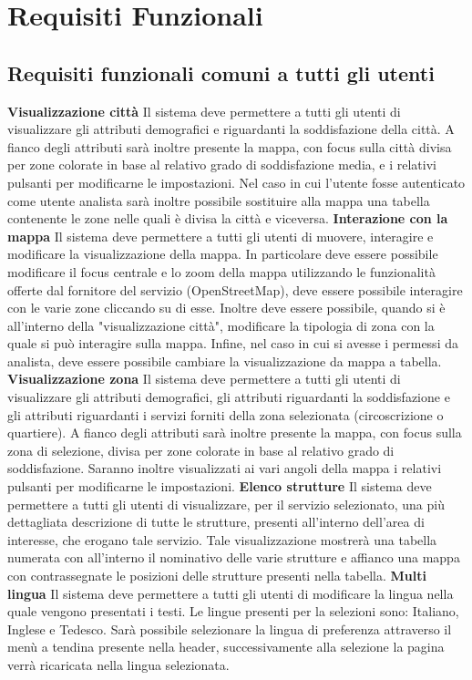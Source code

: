 \chapter{Requisiti Funzionali} 
    \section{Requisiti funzionali comuni a tutti gli utenti}
        \begin{rfList}
            \rfItem \textbf{Visualizzazione città} Il sistema deve permettere a tutti gli utenti di visualizzare gli attributi demografici e riguardanti la soddisfazione della città. A fianco degli attributi sarà inoltre presente la mappa, con focus sulla città divisa per zone colorate in base al relativo grado di soddisfazione media, e i relativi pulsanti per modificarne le impostazioni. Nel caso in cui l'utente fosse autenticato come utente analista sarà inoltre possibile sostituire alla mappa una tabella contenente le zone nelle quali è divisa la città e viceversa.
            \rfItem \textbf{Interazione con la mappa} Il sistema deve permettere a tutti gli utenti di muovere, interagire e modificare la visualizzazione della mappa. In particolare deve essere possibile modificare il focus centrale e lo zoom della mappa utilizzando le funzionalità offerte dal fornitore del servizio (OpenStreetMap), deve essere possibile interagire con le varie zone cliccando su di esse. Inoltre deve essere possibile, quando si è all'interno della "visualizzazione città", modificare la tipologia di zona con la quale si può interagire sulla mappa. Infine, nel caso in cui si avesse i permessi da analista, deve essere possibile cambiare la visualizzazione da mappa a tabella.
            \rfItem \textbf{Visualizzazione zona} Il sistema deve permettere a tutti gli utenti di visualizzare gli attributi demografici, gli attributi riguardanti la soddisfazione e gli attributi riguardanti i servizi forniti della zona selezionata (circoscrizione o quartiere). A fianco degli attributi sarà inoltre presente la mappa, con focus sulla zona di selezione, divisa per zone colorate in base al relativo grado di soddisfazione. Saranno inoltre visualizzati ai vari angoli della mappa i relativi pulsanti per modificarne le impostazioni.
            \rfItem \textbf{Elenco strutture} Il sistema deve permettere a tutti gli utenti di visualizzare, per il servizio selezionato, una più dettagliata descrizione di tutte le strutture, presenti all'interno dell'area di interesse, che erogano tale servizio. Tale visualizzazione mostrerà una tabella numerata con all'interno il nominativo delle varie strutture e affianco una mappa con contrassegnate le posizioni delle strutture presenti nella tabella.
            \rfItem \textbf{Multi lingua} Il sistema deve permettere a tutti gli utenti di modificare la lingua nella quale vengono presentati i testi. Le lingue presenti per la selezioni sono: Italiano, Inglese e Tedesco. Sarà possibile selezionare la lingua di preferenza attraverso il menù a tendina presente nella header, successivamente alla selezione la pagina verrà ricaricata nella lingua selezionata.
        \end{rfList}
